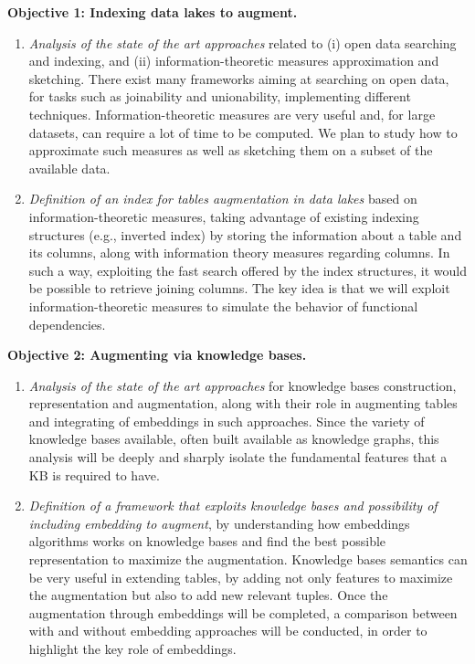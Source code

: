 \bigbreak

\noindent\textbf{Objective 1: Indexing data lakes to augment.}
\begin{enumerate}
    \item \textit{Analysis of the state of the art approaches} related to (i) open data searching and indexing, and (ii) information-theoretic measures approximation and sketching. There exist many frameworks aiming at searching on open data, for tasks such as joinability and unionability, implementing different techniques. Information-theoretic measures are very useful and, for large datasets, can require a lot of time to be computed. We plan to study how to approximate such measures as well as sketching them on a subset of the available data.
    \item \textit{Definition of an index for tables augmentation in data lakes} based on information-theoretic measures, taking advantage of existing indexing structures (e.g., inverted index) by storing the information about a table and its columns, along with information theory measures regarding columns. In such a way, exploiting the fast search offered by the index structures, it would be possible to retrieve joining columns. The key idea is that we will exploit information-theoretic measures to simulate the behavior of functional dependencies. 
\end{enumerate}


\noindent\textbf{Objective 2: Augmenting via knowledge bases.}
\begin{enumerate}
    \item \textit{Analysis of the state of the art approaches} for knowledge bases construction, representation and augmentation, along with their role in augmenting tables and integrating of embeddings in such approaches. Since the variety of knowledge bases available, often built available as knowledge graphs, this analysis will be deeply and sharply isolate the fundamental features that a KB is required to have.
    \item \textit{Definition of a framework that exploits knowledge bases and possibility of including embedding to augment}, by understanding how embeddings algorithms works on knowledge bases and find the best possible representation to maximize the augmentation. Knowledge bases semantics can be very useful in extending tables, by adding not only features to maximize the augmentation but also to add new relevant tuples. Once the augmentation through embeddings will be completed, a comparison between with and without embedding approaches will be conducted, in order to highlight the key role of embeddings.
\end{enumerate}

